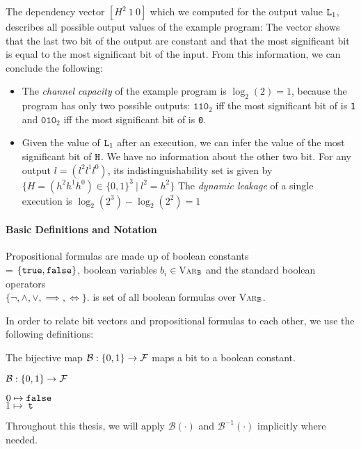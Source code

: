 The dependency vector $[H^2 \: 1 \: 0]$ which we computed for the output value $\mathtt{L}_1$, describes all possible output values of the example program: The vector shows that the last two bit of the output are constant and that the most significant bit is equal to the most significant bit of the input. From this information, we can conclude the following:
\begin{itemize}
    \item The \emph{channel capacity} of the example program is $\log_2(2) = 1$, because the program has only two possible outputs: $\mathtt{110}_2$ iff the most significant bit of \In is \texttt{1} and $\mathtt{010}_2$ iff the most significant bit of \In is \texttt{0}.
    \item Given the value of $\mathtt{L}_1$ after an execution, we can infer the value of the most significant bit of $\mathtt{H}$. We have no information about the other two bit. For any output $l = (l^2 l^1 l^0)$, its indistinguishability set is given by $\{ H = (h^2 h^1 h^0) \in \{0, 1\}^3 \: | \: l^2 = h^2\}$ The \emph{dynamic leakage} of a single execution is $\log_2(2^3) - \log_2(2^2) = 1$
\end{itemize}

\paragraph{Basic Definitions and Notation}
Propositional formulas are made up of boolean constants \\ \bool = $\{ \mathtt{true}, \mathtt{false} \}$, boolean variables $b_i \in $\textsc{Var}$_{\mathbb{B}}$ and the standard boolean operators \\$\{ \lnot, \land, \lor, \implies, \iff \}$. \bform is set of all boolean formulas over \textsc{Var}$_{\mathbb{B}}$.

In order to relate bit vectors and propositional formulas to each other, we use the following definitions:

\begin{definition}\label{def:b}
The bijective map $\mathcal{B}: \{0, 1\} \to  \mathcal{F}$ maps a bit to a boolean constant.
    \begin{center}
        $\mathcal{B}: \{0, 1\} \to  \mathcal{F}$
    \end{center}
    \begin{center}
        $0 \mapsto \mathtt{false}$\\
        $1 \mapsto \mttt$
    \end{center}
Throughout this thesis, we will apply $\mathcal{B}(\cdot)$ and $\mathcal{B}^{-1}(\cdot)$ implicitly where needed.
\end{definition}

